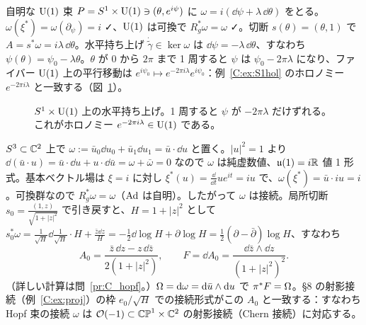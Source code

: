\begin{ex}[$S^1$ 上の水平持ち上げとホロノミー]\label{C:ex:S1P}
自明な $\mathrm{U}(1)$ 束 $P=S^1\times\mathrm{U}(1)\ni(\theta,e^{i\psi})$ に $\omega=i(\dd\psi+\lambda\,\dd\theta)$ をとる。$\omega(\xi^*)=\omega(\partial_\psi)=i$ ✓、$\mathrm{U}(1)$ は可換で $R_g^*\omega=\omega$ ✓。切断 $s(\theta)=(\theta,1)$ で $A=s^*\omega=i\lambda\,\dd\theta$。水平持ち上げ $\dot{\tilde\gamma}\in\ker\omega$ は $\dd\psi=-\lambda\,\dd\theta$、すなわち $\psi(\theta)=\psi_0-\lambda\theta$。$\theta$ が $0$ から $2\pi$ まで 1 周すると $\psi$ は $\psi_0-2\pi\lambda$ になり、ファイバー $\mathrm{U}(1)$ 上の平行移動は $e^{i\psi_0}\mapsto e^{-2\pi i\lambda}e^{i\psi_0}$：例~\ref{C:ex:S1hol} のホロノミー $e^{-2\pi i\lambda}$ と一致する（図~\ref{C:fig:holP}）。
\end{ex}
\begin{figure}[ht]
\centering
{}
\caption{$S^1\times\mathrm{U}(1)$ 上の水平持ち上げ。1 周すると $\psi$ が $-2\pi\lambda$ だけずれる。これがホロノミー $e^{-2\pi i\lambda}\in\mathrm{U}(1)$ である。}
\label{C:fig:holP}
\end{figure}

\begin{ex}\label{C:ex:HopfConn}
$S^3\subset\mathbb C^2$ 上で $\omega:=\bar u_0\dd u_0+\bar u_1\dd u_1=\bar u\cdot\dd u$ と置く。$|u|^2=1$ より $\dd(\bar u\cdot u)=\bar u\cdot\dd u+u\cdot\dd\bar u=\omega+\bar\omega=0$ なので $\omega$ は純虚数値、$\mathfrak{u}(1)=i\mathbb R$ 値 1 形式。基本ベクトル場は $\xi=i$ に対し $\xi^*(u)=\frac{\dd}{\dd t}ue^{it}=iu$ で、$\omega(\xi^*)=\bar u\cdot iu=i$。可換群なので $R_g^*\omega=\omega$（$\mathrm{Ad}$ は自明）。したがって $\omega$ は接続。局所切断 $s_0=\frac{(1,z)}{\sqrt{1+|z|^2}}$ で引き戻すと、$H=1+|z|^2$ として $s_0^*\omega=\frac1{\sqrt H}\dd\frac1{\sqrt H}\cdot H+\frac{\bar z\dd z}{H}=-\tfrac12\dd\log H+\partial\log H=\tfrac12(\partial-\bar\partial)\log H$、すなわち
\[
A_0=\frac{\bar z\,\dd z-z\,\dd\bar z}{2(1+|z|^2)},\qquad F=\dd A_0=\frac{\dd\bar z\wedge\dd z}{(1+|z|^2)^2}.
\]
（詳しい計算は問~\ref{pr:C_hopf}。）$\Omega=\mathrm{d}\omega=\mathrm{d}\bar u\wedge\mathrm{d} u$ で $\pi^*F=\Omega$。§8 の射影接続（例~\ref{C:ex:proj}）の枠 $e_0/\sqrt H$ での接続形式がこの $A_0$ と一致する：すなわち Hopf 束の接続 $\omega$ は $\mathcal O(-1)\subset\mathbb{CP}^1\times\mathbb C^2$ の射影接続（Chern 接続）に対応する。
\end{ex}

